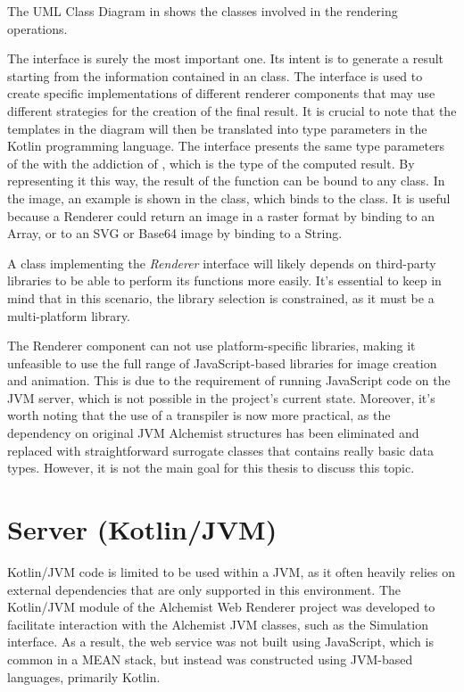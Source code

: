 The UML Class Diagram in  shows the classes involved in the rendering operations.\newline


The  interface is surely the most important one. Its intent is to generate a result starting from the information contained in an  class. The interface is used to create specific implementations of different renderer components that may use different strategies for the creation of the final result. It is crucial to note that the templates in the diagram will then be translated into type parameters in the Kotlin programming language. The  interface presents the same type parameters of the  with the addiction of , which is the type of the computed result.
By representing it this way, the result of the  function can be bound to any class. In the image, an example is shown in the  class, which binds  to the  class. It is useful because a Renderer could return an image in a raster format by binding  to an Array, or to an SVG or Base64 image by binding  to a String.\newline

A class implementing the \textit{Renderer} interface will likely depends on third-party libraries to be able to perform its functions more easily. It's essential to keep in mind that in this scenario, the library selection is constrained, as it must be a multi-platform library.

\begin{info}[Note:]
	The Renderer component can not use platform-specific libraries, making it unfeasible to use the full range of JavaScript-based libraries for image creation and animation. This is due to the requirement of running JavaScript code on the JVM server, which is not possible in the project's current state. Moreover, it's worth noting that the use of a transpiler is now more practical, as the dependency on original JVM Alchemist structures has been eliminated and replaced with straightforward surrogate classes that contains really basic data types. However, it is not the main goal for this thesis to discuss this topic.
\end{info}
\section{Server (Kotlin/JVM)}
\label{sec:server-kotlin-jvm}
Kotlin/JVM code is limited to be used within a JVM, as it often heavily relies on external dependencies that are only supported in this environment. The Kotlin/JVM module of the Alchemist Web Renderer project was developed to facilitate interaction with the Alchemist JVM classes, such as the Simulation interface. As a result, the web service was not built using JavaScript, which is common in a MEAN stack, but instead was constructed using JVM-based languages, primarily Kotlin.
